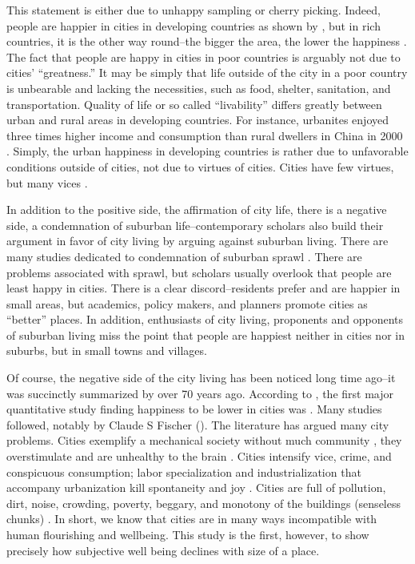 \documentclass[12pt, letterpaper]{article}
\begin{document}
\begin{spacing}{1.9}
\begin{quote}
\end{quote}
This statement is either due to  unhappy sampling or cherry picking. 
Indeed, people are
happier in cities in developing countries as shown by
\citet{aokcities}, but in  rich countries, it is the other way
round--the bigger the area, the lower the happiness \citep{aokCityBook15}. The fact that people
are happy in cities in poor countries is arguably not due to cities' ``greatness.'' It may  be simply that life outside of the city in a
poor country is
unbearable and lacking the necessities, such as food, shelter, sanitation,
and transportation. Quality of life or so called ``livability'' differs greatly between urban and
rural areas in developing countries. For instance, urbanites enjoyed three times
higher income and consumption than rural dwellers in China in 2000
\citep{knight06}. Simply, the urban happiness in developing countries
is rather due to unfavorable conditions outside of cities, not due to virtues of
cities. Cities have few virtues, but many vices \citep{wirth38,park15}.

In addition to the positive side, the affirmation of city life, there is
a negative side, a condemnation of suburban life--contemporary
scholars also build their argument in favor of city living by arguing
against suburban living. There are many studies dedicated to condemnation of
suburban sprawl \citep{kay97,duany01,dreier05,kunstler12,ewing97, frumkin02,
  ewing03}. There are problems associated with sprawl, but scholars usually 
overlook that people are least happy in cities. There is a clear discord--residents
prefer \citep{fuguitt90,fuguitt75} and  are happier in
small areas, but academics, policy makers, and planners promote cities as
``better'' places. In addition,  
 enthusiasts of city living, proponents and opponents of suburban living  miss
the point that people are happiest neither in cities nor in suburbs, but
in small towns and villages. 

Of course, the negative side of the city living has been noticed long time ago--it was succinctly summarized by \citet{wirth38}
over 70 years ago. According to \citet{campbell76etal}, the first major
quantitative study finding happiness to be lower in cities was \citet{gurin60}.
Many studies followed,  notably by  Claude S Fischer
(\citeyear{fischer82,fischer76,fischer75,fischer73,fischer72}).
 The literature has argued many city problems. 
Cities exemplify a mechanical society without much community \citep{tonnies57},
they overstimulate \citep{simmel03} and are unhealthy to  the brain
\citep{lederbogen11}. Cities intensify vice, crime, and conspicuous consumption;
labor specialization and industrialization that accompany urbanization kill
spontaneity and joy \citep{park15,park84,veblen05a,veblen05b,wirth38}. Cities
are 
full of pollution, dirt, noise, crowding, poverty, beggary, and monotony of the
buildings (senseless chunks) \citep{wirth38, white77}.
In short, we know that cities are in many ways incompatible with human flourishing and wellbeing.   
This study is the first, however, to show precisely how subjective well being
declines with size of a place.   


\end{spacing}
\end{document}
